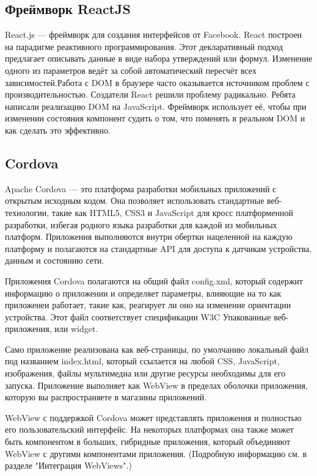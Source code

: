 
\subsection{Фреймворк ReactJS}
\label{sub:domain:other_algos}
React.js — фреймворк для создания интерфейсов от Facebook. React построен на парадигме реактивного программирования. Этот декларативный подход предлагает описывать данные в виде набора утверждений или формул. Изменение одного из параметров ведёт за собой автоматический пересчёт всех зависимостей.Работа с DOM в браузере часто оказывается источником проблем с производительностью. Создатели React решили проблему радикально. Ребята написали реализацию DOM на JavaScript. Фреймворк использует её, чтобы при изменении состояния компонент судить о том, что поменять в реальном DOM и как сделать это эффективно.

\subsection{Cordova}
\label{sub:domain:other_algos2}
Apache Cordova — это платформа разработки мобильных приложений с открытым исходным кодом. Она позволяет использовать стандартные веб-технологии, такие как HTML5, CSS3 и JavaScript для кросс платформенной разработки, избегая родного языка разработки для каждой из мобильных платформ. Приложения выполняются внутри обертки нацеленной на каждую платформу и полагаются на стандартные API для доступа к датчикам устройства, данным и состоянию сети.

Приложения Cordova полагаются на общий файл config.xml, который содержит информацию о приложении и определяет параметры, влияющие на то как приложенеи работает, такие как, реагирует ли оно на изменение ориентации устройства. Этот файл соответствует спецификации W3C Упакованные веб-приложения, или widget.

Само приложение реализована как веб-страницы, по умолчанию локальный файл под названием index.html, который ссылается на любой CSS, JavaScript, изображения, файлы мультимедиа или другие ресурсы необходимы для его запуска. Приложение выполняет как WebView в пределах оболочки приложения, которую вы распространяете в магазины приложений.

WebView с поддержкой Cordova может представлять приложения и полностью его пользовательский интерфейс. На некоторых платформах она также может быть компонентом в больших, гибридные приложения, который объединяют WebView с другими компонентами приложения. (Подробную информацию см. в разделе "Интеграция WebViews".)

